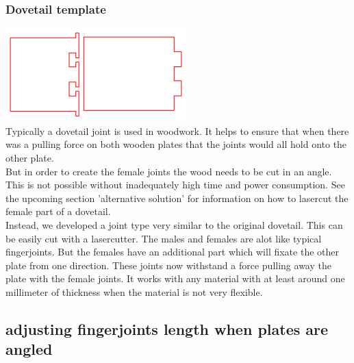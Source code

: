 \documentclass[../ClassicThesis.tex]{subfiles}
\begin{document}
\subsubsection{Dovetail template}
    \includegraphics[width=0.5\columnwidth]{Images/schwalbe.png}
    \\
    Typically a dovetail joint is used in woodwork. It helps to ensure that when there was a pulling force on both wooden plates that the joints would all hold onto the other plate.\\
    But in order to create the female joints the wood needs to be cut in an angle. This is not possible without inadequately high time and power consumption. See the upcoming section 'alternative solution' for information on how to lasercut the female part of a dovetail.\\
    Instead, we developed a joint type very similar to the original dovetail. This can be easily cut with a lasercutter.
    The males and females are alot like typical fingerjoints. But the females have an additional part which will fixate the other plate from one direction.
    These joints now withstand a force pulling away the plate with the female joints. It works with any material with at least around one millimeter of thickness when the material is not very flexible.

\subsection{adjusting fingerjoints length when plates are angled}
\end{document}
